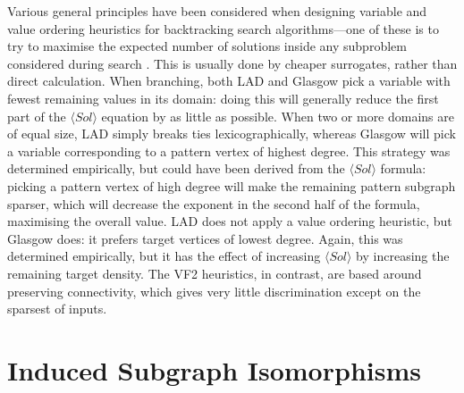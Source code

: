 \documentclass[twoside,11pt]{article}
\newcommand{\citep}[1]{\cite{#1}}
\begin{document}
Various general principles have been considered when designing variable and value ordering
heuristics for backtracking search algorithms---one of these is to try to maximise the expected
number of solutions inside any subproblem considered during search \citep{Gent:1996:EN}.  This is
usually done by cheaper surrogates, rather than direct calculation. When branching, both LAD and
Glasgow pick a variable with fewest remaining values in its domain: doing this will generally reduce
the first part of the $\langle Sol \rangle$ equation by as little as possible. When two or more
domains are of equal size, LAD simply breaks ties lexicographically, whereas Glasgow will pick a
variable corresponding to a pattern vertex of highest degree. This strategy was determined
empirically, but could have been derived from the $\langle Sol \rangle$ formula: picking a pattern
vertex of high degree will make the remaining pattern subgraph sparser, which will decrease the
exponent in the second half of the formula, maximising the overall value. LAD does not apply a value
ordering heuristic, but Glasgow does: it prefers target vertices of lowest degree.  Again, this was
determined empirically, but it has the effect of increasing $\langle Sol \rangle$ by increasing the
remaining target density. The VF2 heuristics, in contrast, are based around preserving connectivity,
which gives very little discrimination except on the sparsest of inputs.

\section{Induced Subgraph Isomorphisms}
\end{document}
